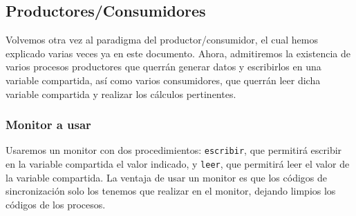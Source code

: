 \subsection{Productores/Consumidores}
Volvemos otra vez al paradigma del productor/consumidor, el cual hemos explicado varias veces ya en este documento. Ahora, admitiremos la existencia de varios procesos productores que querrán generar datos y escribirlos en una variable compartida, así como varios consumidores, que querrán leer dicha variable compartida y realizar los cálculos pertinentes.

\subsubsection{Monitor a usar}
Usaremos un monitor con dos procedimientos: \verb|escribir|, que permitirá escribir en la variable compartida el valor indicado, y \verb|leer|, que permitirá leer el valor de la variable compartida. La ventaja de usar un monitor es que los códigos de sincronización solo los tenemos que realizar en el monitor, dejando limpios los códigos de los procesos.

